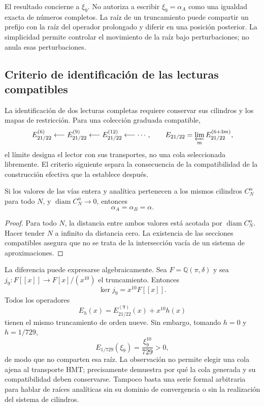 El resultado concierne a \(\xi_9\). No autoriza a escribir
\(\xi_9=\alpha_A\) como una igualdad exacta de números completos.
La raíz de un truncamiento puede compartir un prefijo con la raíz del
operador prolongado y diferir en una posición posterior. La simplicidad
permite controlar el movimiento de la raíz bajo perturbaciones; no
anula esas perturbaciones.

\subsection{Criterio de identificación de las lecturas compatibles}
\label{subsec:alpha-limite-dos-vias}

La identificación de dos lecturas completas requiere conservar sus cilindros
y los mapas de restricción. Para una colección graduada compatible,
\[
 E_{21/22}^{(6)}\longleftarrow E_{21/22}^{(9)}
 \longleftarrow E_{21/22}^{(12)}\longleftarrow\cdots,
 \qquad
 E_{21/22}=\varprojlim_m E_{21/22}^{(6+3m)},
\]
el límite designa el lector con sus transportes, no una cola seleccionada
libremente. El criterio siguiente separa la consecuencia de la
compatibilidad de la construcción efectiva que la establece después.

\begin{proposition}
\label{prop:alpha-dos-limites}
Si los valores de las vías entera y analítica pertenecen a los
mismos cilindros \(C_N^\alpha\) para todo \(N\), y
\(\operatorname{diam}C_N^\alpha\to0\), entonces
\[
 \alpha_A=\alpha_B=\alpha.
\]
\end{proposition}

\begin{proof}
Para todo \(N\), la distancia entre ambos valores está acotada
por \(\operatorname{diam}C_N^\alpha\). Hacer tender \(N\) a infinito
da distancia cero. La existencia de las secciones compatibles asegura
que no se trata de la intersección vacía de un sistema de aproximaciones.
\end{proof}

La diferencia puede expresarse algebraicamente. Sea
\(F=\mathbb Q(\pi,\delta)\) y sea
\(j_9:F[[x]]\to F[x]/(x^{10})\) el truncamiento. Entonces
\[
 \ker j_9=x^{10}F[[x]].
\]
Todos los operadores
\[
 E_h(x)=E_{21/22}^{(9)}(x)+x^{10}h(x)
\]
tienen el mismo truncamiento de orden nueve. Sin embargo, tomando
\(h=0\) y \(h=1/729\),
\[
 E_{1/729}(\xi_9)=\frac{\xi_9^{10}}{729}>0,
\]
de modo que no comparten esa raíz. La observación no permite elegir una
cola ajena al transporte HMT; precisamente demuestra por qué la cola
generada y su compatibilidad deben conservarse. Tampoco basta una serie
formal arbitraria para hablar de raíces analíticas sin su dominio de
convergencia o sin la realización del sistema de cilindros.



